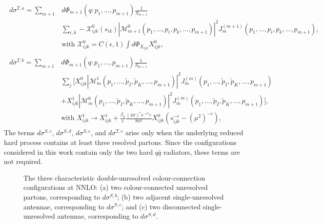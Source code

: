 \begin{equation}
    \begin{gathered}
        \begin{aligned}
            d\sigma^{T,a} = \sum_{m+1}&d\Phi_{m+1}(q:p_1,...,p_{m+1})\frac1{S_{m+1}}\\
                                      &\sum_{i,k}-\mathcal X_{ijk}^0(s_{ik})|\mathcal M_{m+1}^0(p_1,...,p_i,p_k,...,p_{m+1})|^2J_m^{(m+1)}(p_1,...,p_i,p_k,...,p_{m+1}),\\
                                      &\text{with }\mathcal X_{ijk}^0=C(\epsilon,1)\int d\Phi_{X_{ijk}} X_{ijk}^0,
        \end{aligned}\\
        \begin{aligned}
            d\sigma^{T,b} = \sum_{m+1}&d\Phi_{m+1}(q:p_1,...,p_{m+1})\frac1{S_{m+1}}\\
                                      &\sum_j\Big[X_{ijk}^0|\mathcal M_m^1(p_1,...,\tilde p_I,\tilde p_K,...,p_{m+1})|^2J_m^{(m)}(p_1,...,\tilde p_I,\tilde p_K,...,p_{m+1})\\
                                      &+X_{ijk}^1|\mathcal M_m^0(p_1,...,\tilde p_I,\tilde p_K,...,p_{m+1})|^2J_m^{(m)}(p_1,...,\tilde p_I,\tilde p_K,...,p_{m+1})\Big],\\
                                      &\text{with }X_{ijk}^1\rightarrow X_{ijk}^1+\frac{\beta_0}\epsilon\frac{(4\pi)^\epsilon e^{-\epsilon\gamma_E}}{8\pi^2}X_{ijk}^0\left(s_{ijk}^{-\epsilon}-(\mu^2)^{-\epsilon}\right),
        \end{aligned}
    \end{gathered}
\end{equation}
The terms $d\sigma^{S,c}$, $d\sigma^{S,d}$, $d\sigma^{S,e}$, and $d\sigma^{T,c}$ arise only when the
underlying reduced hard process contains at least three resolved partons. Since the
configurations considered in this work contain only the two hard $q\bar q$ radiators,
these terms are not required.

\begin{figure}[h!]
\centering

\par\medskip

\par\medskip

\caption{\centering The three characteristic double-unresolved colour-connection configurations at NNLO: (a) two colour-connected unresolved partons, corresponding to $d\sigma^{S,b}$; (b) two adjacent single-unresolved antennae, corresponding to $d\sigma^{S,c}$; and (c) two disconnected single-unresolved antennae, corresponding to $d\sigma^{S,d}$.}
\label{fig:colourConnectionNNLOall}
\end{figure}

